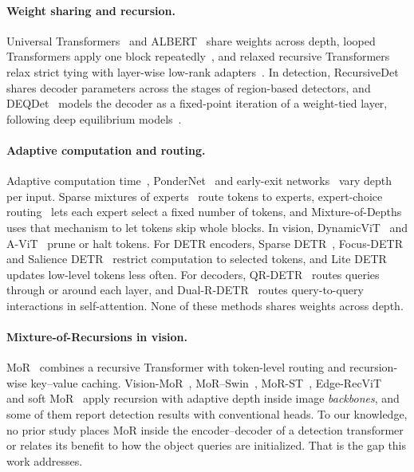 \documentclass[pdflatex,iicol,sn-basic,Numbered]{sn-jnl}
\begin{document}
\paragraph{Weight sharing and recursion.}
Universal Transformers~\cite{dehghani2019universal} and ALBERT~\cite{lan2020albert} share weights across depth, looped Transformers apply one block repeatedly~\cite{giannou2023looped}, and relaxed recursive Transformers relax strict tying with layer-wise low-rank adapters~\cite{bae2025relaxed}. In detection, RecursiveDet~\cite{zhao2023recursivedet} shares decoder parameters across the stages of region-based detectors, and DEQDet~\cite{wang2023deqdet} models the decoder as a fixed-point iteration of a weight-tied layer, following deep equilibrium models~\cite{bai2019deq}.

\paragraph{Adaptive computation and routing.}
Adaptive computation time~\cite{graves2016act}, PonderNet~\cite{banino2021pondernet} and early-exit networks~\cite{teerapittayanon2016branchynet} vary depth per input. Sparse mixtures of experts~\cite{shazeer2017moe,fedus2022switch} route tokens to experts, expert-choice routing~\cite{zhou2022expertchoice} lets each expert select a fixed number of tokens, and Mixture-of-Depths~\cite{raposo2024mod} uses that mechanism to let tokens skip whole blocks. In vision, DynamicViT~\cite{rao2021dynamicvit} and A-ViT~\cite{yin2022avit} prune or halt tokens. For DETR encoders, Sparse DETR~\cite{roh2022sparse}, Focus-DETR~\cite{zheng2023focus} and Salience DETR~\cite{hou2024salience} restrict computation to selected tokens, and Lite DETR~\cite{li2023lite} updates low-level tokens less often. For decoders, QR-DETR~\cite{senthivel2024qrdetr} routes queries through or around each layer, and Dual-R-DETR~\cite{route2025detr} routes query-to-query interactions in self-attention. None of these methods shares weights across depth.

\paragraph{Mixture-of-Recursions in vision.}
MoR~\cite{bae2025mor} combines a recursive Transformer with token-level routing and recursion-wise key--value caching. Vision-MoR~\cite{visionmor2026}, MoR--Swin~\cite{morswin2026}, MoR-ST~\cite{morst2026}, Edge-RecViT~\cite{edgerecvit2026} and soft MoR~\cite{softmor2026} apply recursion with adaptive depth inside image \emph{backbones}, and some of them report detection results with conventional heads. To our knowledge, no prior study places MoR inside the encoder--decoder of a detection transformer or relates its benefit to how the object queries are initialized. That is the gap this work addresses.
\end{document}
